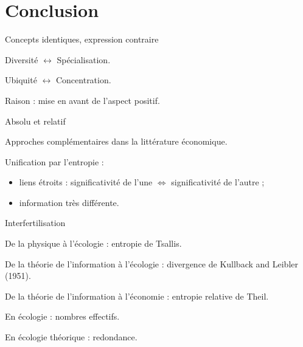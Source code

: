 \documentclass[ignorenonframetext,]{beamer}
\begin{document}
\section{Conclusion}\label{conclusion}

\begin{frame}{Concepts identiques, expression contraire}

Diversité \(\leftrightarrow\) Spécialisation.

Ubiquité \(\leftrightarrow\) Concentration.

Raison : mise en avant de l'aspect positif.

\end{frame}

\begin{frame}{Absolu et relatif}

Approches complémentaires dans la littérature économique.

Unification par l'entropie :

\begin{itemize}
\item
  liens étroits : significativité de l'une \(\iff\) significativité de
  l'autre ;
\item
  information très différente.
\end{itemize}

\end{frame}

\begin{frame}{Interfertilisation}

De la physique à l'écologie : entropie de Tsallis.

De la théorie de l'information à l'écologie : divergence de Kullback and
Leibler (1951).

De la théorie de l'information à l'économie : entropie relative de
Theil.

En écologie : nombres effectifs.

En écologie théorique : redondance.

\end{frame}
\end{document}
